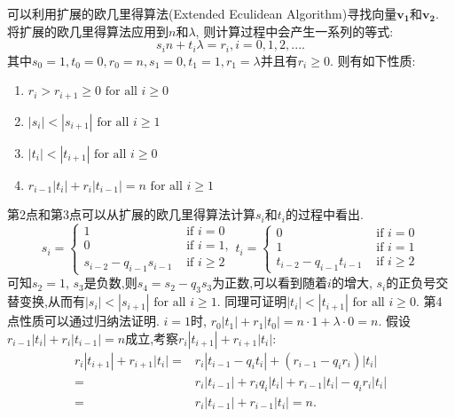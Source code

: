 \documentclass{article}
\begin{document}
可以利用扩展的欧几里得算法(Extended Eculidean Algorithm)寻找向量$\mathbf{v_1}$和$\mathbf{v_2}$.
将扩展的欧几里得算法应用到$n$和$\lambda$, 则计算过程中会产生一系列的等式:
\begin{equation}
\label{eq-eea}
s_i n + t_i \lambda = r_i, i = 0, 1, 2, ....
\end{equation}
其中$s_0 = 1, t_0 = 0, r_0 = n, s_1 =0, t_1 = 1, r_1 = \lambda$并且有$r_i \ge 0$.
则有如下性质:
\begin{enumerate}
\item $r_i > r_{i+1} \ge 0 \text{ for all } i \ge 0$
\item $|s_i| < |s_{i+1}| \text{ for all } i \ge 1$
\item $|t_i| < |t_{i+1}| \text{ for all } i \ge 0$
\item $r_{i-1}|t_i| + r_i|t_{i-1}| = n \text{ for all } i \ge 1$
\end{enumerate}
第2点和第3点可以从扩展的欧几里得算法计算$s_i$和$t_i$的过程中看出.
\begin{equation}\nonumber
s_i = \left\{
\begin{array}{ll}
1 & \text{ if } i = 0 \\
0 & \text{ if } i = 1, \\
s_{i-2} - q_{i-1}s_{i-1} & \text{ if } i \ge 2 
\end{array}
\right. 
t_i = \left\{
\begin{array}{ll}
0 & \text{ if } i = 0 \\
1 & \text{ if } i = 1 \\
t_{i-2} - q_{i-1}t_{i-1} & \text{ if } i \ge 2 
\end{array}
\right.
\end{equation}
可知$s_2 = 1$, $s_3$是负数,则$s_4 = s_2 - q_3s_3$为正数,可以看到随着$i$的增大,
$s_i$的正负号交替变换,从而有$|s_i| < |s_{i+1}| \text{ for all } i \ge 1$.
同理可证明$|t_i| < |t_{i+1}| \text{ for all } i \ge 0$.
第4点性质可以通过归纳法证明. $i = 1$时, $r_0|t_1| + r_1|t_0| = n \cdot 1 + \lambda \cdot 0 = n$.
假设$r_{i-1}|t_i| + r_i|t_{i-1}| = n$成立,考察$r_{i}|t_{i+1}| + r_{i+1}|t_{i}|$:
\begin{equation}\nonumber
\begin{split}
r_{i}|t_{i+1}| + r_{i+1}|t_{i}| = & r_{i}|t_{i-1} - q_{i}t_{i}| + (r_{i-1}-q_{i}r_{i})|t_{i}| \\
= & r_i|t_{i-1}| + r_iq_i|t_i| + r_{i-1}|t_i| - q_ir_i|t_i|\\
= & r_i|t_{i-1}|+ r_{i-1}|t_i| = n.
\end{split}
\end{equation}
\end{document}
